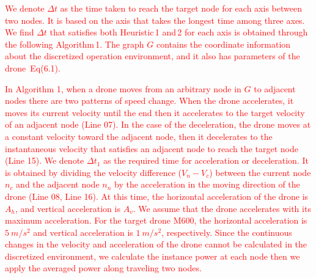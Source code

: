 \documentclass[journal]{./template/IEEEtran}
\begin{document}
\textcolor{red}{We denote $\Delta t$ as the time taken to reach the target node for each axis between two nodes. It is based on the axis that takes the longest time among three axes. We find $\Delta t$ that satisfies both Heuristic\,1 and\,2 for each axis is obtained through the following Algorithm\,1. 
The graph $G$ contains the coordinate information about the discretized operation environment, and it also has parameters of the drone~Eq(6.1).}

\textcolor{red}{In Algorithm 1, when a drone moves from an arbitrary node in $G$ to adjacent nodes there are two patterns of speed change. When the drone accelerates, it moves its current velocity until the end then it accelerates to the target velocity of an adjacent node (Line 07). 
In the case of the deceleration, the drone moves at a constant velocity toward the adjacent node, then it decelerates to the instantaneous velocity that satisfies an adjacent node to reach the target node (Line 15).
We denote $\Delta t_1$ as the required time for acceleration or deceleration. It is obtained by dividing the velocity difference ($V_n - V_c$) between the current node $n_c$ and the adjacent node $n_n$ by the acceleration in the moving direction of the drone (Line 08, Line 16).
At this time, the horizontal acceleration of the drone is $A_h$, and vertical acceleration is $A_v$. We assume that the drone accelerates with its maximum acceleration. For the target drone M600, the horizontal acceleration is $5~m/s^2$ and vertical acceleration is $1~m/s^2$, respectively.
Since the continuous changes in the velocity and acceleration of the drone cannot be calculated in the discretized environment, we calculate the instance power at each node then we apply the averaged power along traveling two nodes.
}
\end{document}
